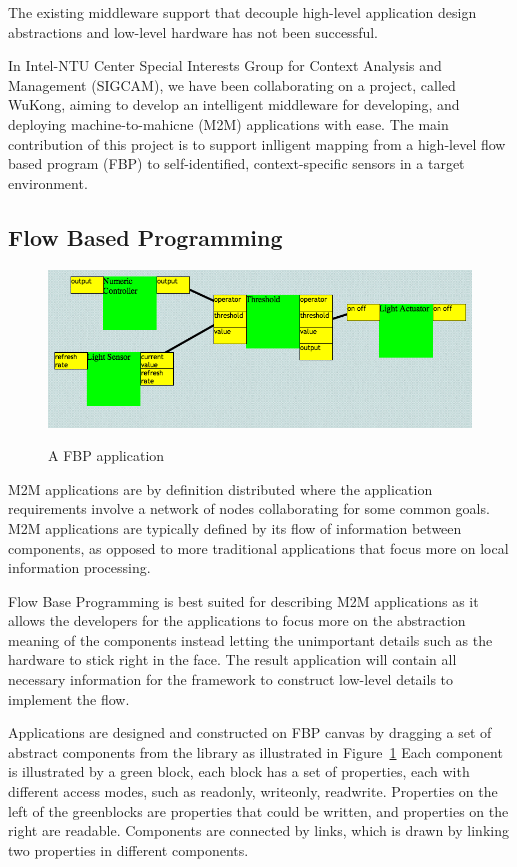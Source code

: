 The existing middleware support that decouple high-level application design
abstractions and low-level hardware has not been successful.

In Intel-NTU Center Special Interests Group for Context Analysis and Management 
(SIGCAM), we have been collaborating on a project, called WuKong, aiming to develop 
an intelligent middleware for developing, and deploying machine-to-mahicne 
(M2M) applications with ease. The main contribution of this project is to support
inlligent mapping from a high-level flow based program (FBP) to
self-identified, context-specific sensors in a target
environment\cite{Reijers}.

\subsection{Flow Based Programming}

\begin{figure}[h!]
\caption{A FBP application}
\centering
    \includegraphics[width=\linewidth]{figures/fbp-application}
\label{fig:fbp-application}
\end{figure}

M2M applications are by definition distributed where the application
requirements involve a network of nodes collaborating for some common 
goals. M2M applications are typically defined by its flow of information
between components, as opposed to more traditional applications that focus more
on local information processing.

Flow Base Programming is best suited for describing M2M applications as it
allows the developers for the applications to focus more on the
abstraction meaning of the components instead letting the unimportant details
such as the hardware to stick right in the face. The result application will
contain all necessary information for the framework to construct low-level
details to implement the flow.

Applications are designed and constructed on FBP canvas by dragging a set of
abstract components from the library as illustrated in Figure~\ref{fig:fbp-application} 
Each component is
illustrated by a green block, each block has a set of properties, each with
different access modes, such as readonly, writeonly, readwrite. Properties on
the left of the greenblocks are properties that could be written, and
properties on the right are readable. Components are connected by links, which
is drawn by linking two properties in different components.

